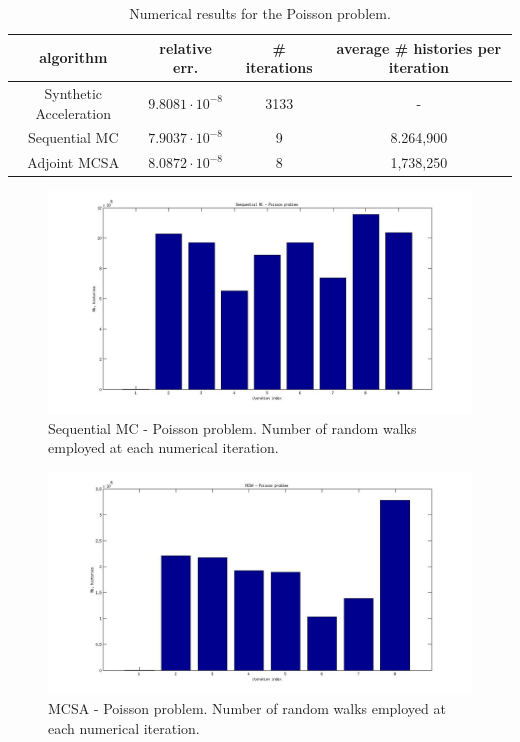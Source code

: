 \documentclass[a4paper,10pt]{article}
\begin{document}
\begin{table}[!h]
\centering
\hspace*{-0.8cm}
\begin{tabular}{|c|c|c|c|}
\hline
algorithm & relative err.& \# iterations & average \# histories per iteration\\
\hline
Synthetic Acceleration & $9.8081\cdot 10^{-8}$ & 3133 & - \\ 
\hline
Sequential MC & $7.9037 \cdot 10^{-8}$ & 9 & 8.264,900\\
\hline
 Adjoint MCSA & $8.0872\cdot 10^{-8}$ & 8 & 1,738,250\\
\hline
\end{tabular}
\caption{Numerical results for the Poisson problem.}
\label{Poisson_results}
\end{table}


\begin{figure}[h!]
  \centering
    \includegraphics[width=\textwidth]{SEQ_poisson.jpg}
    \caption{Sequential MC - Poisson problem. Number of random walks employed 
at each numerical iteration.}
\label{SEQ_poisson}
\end{figure}


\begin{figure}[h!]
  \centering
    \includegraphics[width=\textwidth]{MCSA_poisson.jpg}
      \caption{MCSA - Poisson problem. Number of random walks employed at each 
numerical iteration.}
\label{MCSA_poisson}
\end{figure}
\end{document}
